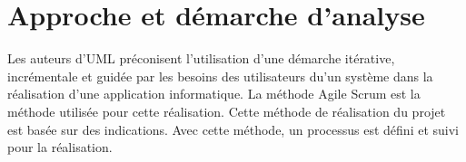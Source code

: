 \section{Approche et démarche d'analyse}

 Les auteurs d’UML préconisent l’utilisation d'une démarche itérative, incrémentale et guidée par les besoins des utilisateurs du'un système dans la réalisation d’une application informatique.
 La méthode Agile Scrum est la méthode utilisée pour cette réalisation. Cette méthode de réalisation du projet est basée sur des indications. Avec cette méthode, un processus est défini et suivi pour la réalisation. 
 


